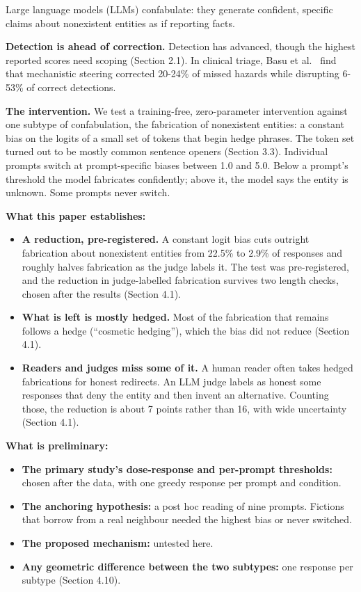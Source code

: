 \documentclass[11pt,letterpaper]{article}
\providecommand{\tightlist}{\setlength{\itemsep}{0pt}\setlength{\parskip}{0pt}}
\DeclareRobustCommand{\_}{\textunderscore\allowbreak}
\begin{document}
Large language models (LLMs) confabulate: they generate confident, specific claims about nonexistent entities as if reporting facts.

\textbf{Detection is ahead of correction.} Detection has advanced, though the highest reported scores need scoping (Section 2.1). In clinical triage, Basu et al.~\cite{basu2026interpretability} find that mechanistic steering corrected 20-24\% of missed hazards while disrupting 6-53\% of correct detections.

\textbf{The intervention.} We test a training-free, zero-parameter intervention against one subtype of confabulation, the fabrication of nonexistent entities: a constant bias on the logits of a small set of tokens that begin hedge phrases. The token set turned out to be mostly common sentence openers (Section 3.3). Individual prompts switch at prompt-specific biases between 1.0 and 5.0. Below a prompt's threshold the model fabricates confidently; above it, the model says the entity is unknown. Some prompts never switch.

\textbf{What this paper establishes:}

\begin{itemize}
\tightlist
\item
  \textbf{A reduction, pre-registered.} A constant logit bias cuts outright fabrication about nonexistent entities from 22.5\% to 2.9\% of responses and roughly halves fabrication as the judge labels it. The test was pre-registered, and the reduction in judge-labelled fabrication survives two length checks, chosen after the results (Section 4.1).
\item
  \textbf{What is left is mostly hedged.} Most of the fabrication that remains follows a hedge (``cosmetic hedging''), which the bias did not reduce (Section 4.1).
\item
  \textbf{Readers and judges miss some of it.} A human reader often takes hedged fabrications for honest redirects. An LLM judge labels as honest some responses that deny the entity and then invent an alternative. Counting those, the reduction is about 7 points rather than 16, with wide uncertainty (Section 4.1).
\end{itemize}

\textbf{What is preliminary:}

\begin{itemize}
\tightlist
\item
  \textbf{The primary study's dose-response and per-prompt thresholds:} chosen after the data, with one greedy response per prompt and condition.
\item
  \textbf{The anchoring hypothesis:} a post hoc reading of nine prompts. Fictions that borrow from a real neighbour needed the highest bias or never switched.
\item
  \textbf{The proposed mechanism:} untested here.
\item
  \textbf{Any geometric difference between the two subtypes:} one response per subtype (Section 4.10).
\end{itemize}
\end{document}
